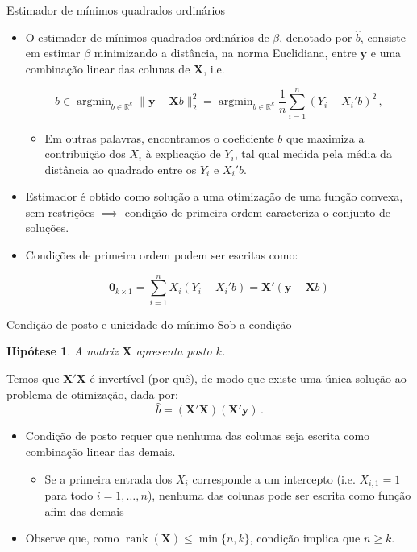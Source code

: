 \documentclass[11pt]{beamer}
\newtheorem{assumption}{Hipótese}
\begin{document}
\begin{frame}{Estimador de mínimos quadrados ordinários}
\begin{itemize}
	\item O estimador de mínimos quadrados ordinários de $\beta$, denotado por $\hat{b}$, consiste em estimar $\beta$ minimizando a distância, na norma Euclidiana, entre $\boldsymbol{y}$ e uma combinação linear das colunas de $\boldsymbol{X}$, i.e. 
	
	$$\hat{b} \in \operatorname{argmin}_{b\in \mathbb{R}^k} \lVert \boldsymbol{y} - \boldsymbol{X}b \rVert_2^2 = \operatorname{argmin}_{b\in \mathbb{R}^k}\frac{1}{n}\sum_{i=1}^n (Y_i - X_i'b)^2\, ,$$
	\begin{itemize}
		\item Em outras palavras, encontramos o coeficiente $b$ que maximiza a contribuição dos $X_i$ à explicação de $Y_i$, tal qual medida pela média da distância ao quadrado entre os $Y_i$ e $X_i'b$.
	\end{itemize}
	\item Estimador é obtido como solução a uma otimização de uma função convexa, sem restrições $\implies$ condição de primeira ordem caracteriza o conjunto de soluções.
	\item Condições de primeira ordem podem ser escritas como:
	
	$$\boldsymbol{0}_{k \times 1}= \sum_{i=1}^n X_i(Y_i - X_i'b) = \boldsymbol{X}'(\boldsymbol{y}-\boldsymbol{X}b)$$
	
	
	
\end{itemize}
\end{frame}
\begin{frame}{Condição de posto e unicidade do mínimo}
Sob a condição
\begin{assumption}
	A matriz $\boldsymbol{X}$ apresenta posto $k$.
	\end{assumption}
	Temos que $\boldsymbol{X}'\boldsymbol{X}$ é invertível (por quê), de modo que  existe uma única solução ao problema de otimização, dada por:
	$$\hat{b} = (\boldsymbol{X}'\boldsymbol{X})(\boldsymbol{X}'\boldsymbol{y})\, .$$
	\begin{itemize}
		\item Condição de posto requer que nenhuma das colunas seja escrita como combinação linear das demais.
		\begin{itemize}
			\item Se a primeira entrada dos $X_i$ corresponde a um intercepto (i.e. $X_{i,1}=1$ para todo $i=1,\ldots, n$), nenhuma das colunas pode ser escrita como função afim das demais 
		\end{itemize}
		\item Observe que, como $\operatorname{rank}(\boldsymbol{X}) \leq \min\{n,k\}$, condição implica que $n \geq k$.
	\end{itemize}
\end{frame}
\end{document}
